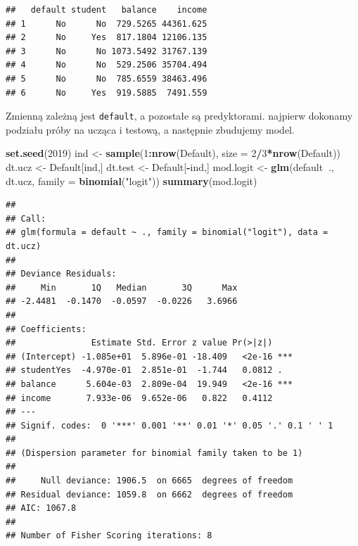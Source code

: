 \documentclass[]{book}
\newenvironment{Shaded}{\begin{snugshade}}{\end{snugshade}}
\newcommand{\DataTypeTok}[1]{\textcolor[rgb]{0.13,0.29,0.53}{#1}}
\newcommand{\DecValTok}[1]{\textcolor[rgb]{0.00,0.00,0.81}{#1}}
\newcommand{\KeywordTok}[1]{\textcolor[rgb]{0.13,0.29,0.53}{\textbf{#1}}}
\newcommand{\NormalTok}[1]{#1}
\newcommand{\OperatorTok}[1]{\textcolor[rgb]{0.81,0.36,0.00}{\textbf{#1}}}
\newcommand{\StringTok}[1]{\textcolor[rgb]{0.31,0.60,0.02}{#1}}
\theoremstyle{plain}
\theoremstyle{definition}
\theoremstyle{definition}
\theoremstyle{definition}
\theoremstyle{definition}
\theoremstyle{remark}
\begin{document}
\begin{verbatim}
##   default student   balance    income
## 1      No      No  729.5265 44361.625
## 2      No     Yes  817.1804 12106.135
## 3      No      No 1073.5492 31767.139
## 4      No      No  529.2506 35704.494
## 5      No      No  785.6559 38463.496
## 6      No     Yes  919.5885  7491.559
\end{verbatim}

Zmienną zależną jest \texttt{default}, a pozostałe są predyktorami. najpierw dokonamy podziału próby na ucząca i testową, a następnie zbudujemy model.

\begin{Shaded}
\begin{Highlighting}[]
\KeywordTok{set.seed}\NormalTok{(}\DecValTok{2019}\NormalTok{)}
\NormalTok{ind <-}\StringTok{ }\KeywordTok{sample}\NormalTok{(}\DecValTok{1}\OperatorTok{:}\KeywordTok{nrow}\NormalTok{(Default), }\DataTypeTok{size =} \DecValTok{2}\OperatorTok{/}\DecValTok{3}\OperatorTok{*}\KeywordTok{nrow}\NormalTok{(Default))}
\NormalTok{dt.ucz <-}\StringTok{ }\NormalTok{Default[ind,]}
\NormalTok{dt.test <-}\StringTok{ }\NormalTok{Default[}\OperatorTok{-}\NormalTok{ind,]}
\NormalTok{mod.logit <-}\StringTok{ }\KeywordTok{glm}\NormalTok{(default}\OperatorTok{~}\NormalTok{., dt.ucz, }\DataTypeTok{family =} \KeywordTok{binomial}\NormalTok{(}\StringTok{"logit"}\NormalTok{))}
\KeywordTok{summary}\NormalTok{(mod.logit)}
\end{Highlighting}
\end{Shaded}

\begin{verbatim}
## 
## Call:
## glm(formula = default ~ ., family = binomial("logit"), data = dt.ucz)
## 
## Deviance Residuals: 
##     Min       1Q   Median       3Q      Max  
## -2.4481  -0.1470  -0.0597  -0.0226   3.6966  
## 
## Coefficients:
##               Estimate Std. Error z value Pr(>|z|)    
## (Intercept) -1.085e+01  5.896e-01 -18.409   <2e-16 ***
## studentYes  -4.970e-01  2.851e-01  -1.744   0.0812 .  
## balance      5.604e-03  2.809e-04  19.949   <2e-16 ***
## income       7.933e-06  9.652e-06   0.822   0.4112    
## ---
## Signif. codes:  0 '***' 0.001 '**' 0.01 '*' 0.05 '.' 0.1 ' ' 1
## 
## (Dispersion parameter for binomial family taken to be 1)
## 
##     Null deviance: 1906.5  on 6665  degrees of freedom
## Residual deviance: 1059.8  on 6662  degrees of freedom
## AIC: 1067.8
## 
## Number of Fisher Scoring iterations: 8
\end{verbatim}
\end{document}
